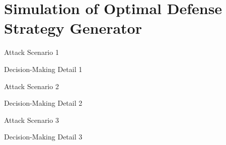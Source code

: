 
\section{Simulation of Optimal Defense Strategy Generator}

\begin{frame}{Attack Scenario 1}

\end{frame}

\begin{frame}{Decision-Making Detail 1}

\end{frame}

\begin{frame}{Attack Scenario 2}

\end{frame}

\begin{frame}{Decision-Making Detail 2}

\end{frame}

\begin{frame}{Attack Scenario 3}

\end{frame}

\begin{frame}{Decision-Making Detail 3}

\end{frame}

